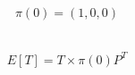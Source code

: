 \documentclass[12pt, a4paper]{article}
\begin{document}
\begin{subequations}
  \begin{align}
    \pi(0) = (1, 0, 0)
  \end{align}
\end{subequations}

\subsection{}
\begin{subequations}
  \begin{align}
    E[T] = T \times \pi(0)P^T
  \end{align}
\end{subequations}
\end{document}
